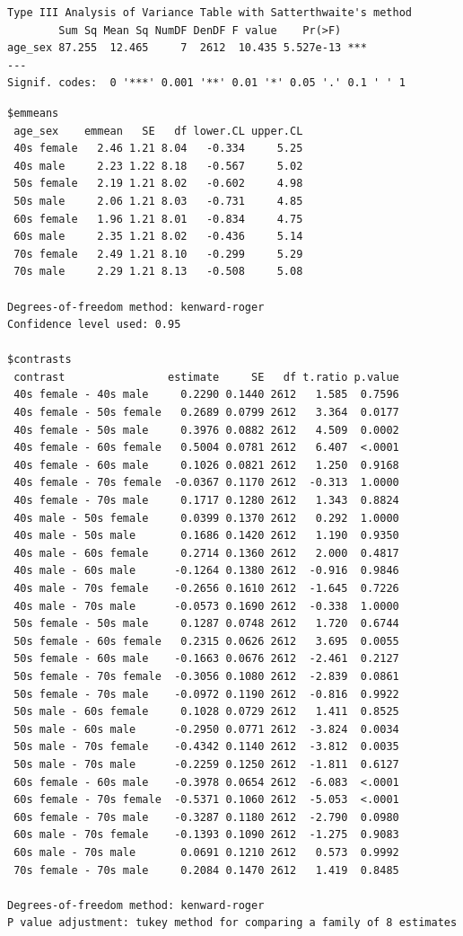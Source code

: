 \documentclass[
  letterpaper,
  DIV=11,
  numbers=noendperiod]{scrartcl}
\begin{document}
\begin{verbatim}
Type III Analysis of Variance Table with Satterthwaite's method
        Sum Sq Mean Sq NumDF DenDF F value    Pr(>F)    
age_sex 87.255  12.465     7  2612  10.435 5.527e-13 ***
---
Signif. codes:  0 '***' 0.001 '**' 0.01 '*' 0.05 '.' 0.1 ' ' 1
\end{verbatim}

\begin{verbatim}
$emmeans
 age_sex    emmean   SE   df lower.CL upper.CL
 40s female   2.46 1.21 8.04   -0.334     5.25
 40s male     2.23 1.22 8.18   -0.567     5.02
 50s female   2.19 1.21 8.02   -0.602     4.98
 50s male     2.06 1.21 8.03   -0.731     4.85
 60s female   1.96 1.21 8.01   -0.834     4.75
 60s male     2.35 1.21 8.02   -0.436     5.14
 70s female   2.49 1.21 8.10   -0.299     5.29
 70s male     2.29 1.21 8.13   -0.508     5.08

Degrees-of-freedom method: kenward-roger 
Confidence level used: 0.95 

$contrasts
 contrast                estimate     SE   df t.ratio p.value
 40s female - 40s male     0.2290 0.1440 2612   1.585  0.7596
 40s female - 50s female   0.2689 0.0799 2612   3.364  0.0177
 40s female - 50s male     0.3976 0.0882 2612   4.509  0.0002
 40s female - 60s female   0.5004 0.0781 2612   6.407  <.0001
 40s female - 60s male     0.1026 0.0821 2612   1.250  0.9168
 40s female - 70s female  -0.0367 0.1170 2612  -0.313  1.0000
 40s female - 70s male     0.1717 0.1280 2612   1.343  0.8824
 40s male - 50s female     0.0399 0.1370 2612   0.292  1.0000
 40s male - 50s male       0.1686 0.1420 2612   1.190  0.9350
 40s male - 60s female     0.2714 0.1360 2612   2.000  0.4817
 40s male - 60s male      -0.1264 0.1380 2612  -0.916  0.9846
 40s male - 70s female    -0.2656 0.1610 2612  -1.645  0.7226
 40s male - 70s male      -0.0573 0.1690 2612  -0.338  1.0000
 50s female - 50s male     0.1287 0.0748 2612   1.720  0.6744
 50s female - 60s female   0.2315 0.0626 2612   3.695  0.0055
 50s female - 60s male    -0.1663 0.0676 2612  -2.461  0.2127
 50s female - 70s female  -0.3056 0.1080 2612  -2.839  0.0861
 50s female - 70s male    -0.0972 0.1190 2612  -0.816  0.9922
 50s male - 60s female     0.1028 0.0729 2612   1.411  0.8525
 50s male - 60s male      -0.2950 0.0771 2612  -3.824  0.0034
 50s male - 70s female    -0.4342 0.1140 2612  -3.812  0.0035
 50s male - 70s male      -0.2259 0.1250 2612  -1.811  0.6127
 60s female - 60s male    -0.3978 0.0654 2612  -6.083  <.0001
 60s female - 70s female  -0.5371 0.1060 2612  -5.053  <.0001
 60s female - 70s male    -0.3287 0.1180 2612  -2.790  0.0980
 60s male - 70s female    -0.1393 0.1090 2612  -1.275  0.9083
 60s male - 70s male       0.0691 0.1210 2612   0.573  0.9992
 70s female - 70s male     0.2084 0.1470 2612   1.419  0.8485

Degrees-of-freedom method: kenward-roger 
P value adjustment: tukey method for comparing a family of 8 estimates 
\end{verbatim}
\end{document}
